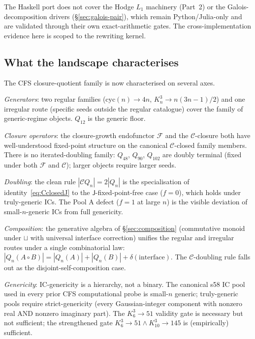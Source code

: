 \documentclass[12pt,a4paper]{article}
\theoremstyle{definition}
\theoremstyle{remark}
\newcommand{\Kn}{K_n^3}
\newcommand{\Qn}{Q_n}
\newcommand{\Ccls}{\mathcal{C}}             %
\newcommand{\Fcls}{\mathcal{F}}             %
\newcommand{\Jconj}{\mathsf{J}}             %
\newcommand{\cyc}{\mathrm{cyc}}
\begin{document}
The Haskell port does not cover the Hodge $L_1$ machinery (Part~2) or
the Galois-decomposition drivers (\S\ref{sec:galois-pair}), which
remain Python/Julia-only and are validated through their own
exact-arithmetic gates. The cross-implementation evidence here is
scoped to the rewriting kernel.

\subsection{What the landscape characterises}\label{sec:disc-characterises}

The CFS closure-quotient family is now characterised on several axes.

\emph{Generators}: two regular families ($\cyc(n) \to 4n$, $\Kn \to
n(3n{-}1)/2$) and one irregular route (specific seeds outside the
regular catalogue) cover the family of generic-regime objects.
$Q_{12}$ is the generic floor.

\emph{Closure operators}: the closure-growth endofunctor $\Fcls$ and
the $\Ccls$-closure both have well-understood fixed-point structure
on the canonical $\Ccls$-closed family members. There is no
iterated-doubling family: $Q_{48}$, $Q_{90}$, $Q_{102}$ are doubly
terminal (fixed under both $\Fcls$ and $\Ccls$); larger objects
require larger seeds.

\emph{Doubling}: the clean rule $|\Ccls\Qn| = 2|\Qn|$ is the
specialisation of identity~\eqref{eq:CclosedJ} to the
$\Jconj$-fixed-point-free case ($f = 0$), which holds under
truly-generic ICs. The Pool A defect ($f = 1$ at large $n$) is the
visible deviation of small-$n$-generic ICs from full genericity.

\emph{Composition}: the generative algebra of \S\ref{sec:composition}
(commutative monoid under $\sqcup$ with universal interface
correction) unifies the regular and irregular routes under a single
combinatorial law: $|\Qn(A \circ B)| = |\Qn(A)| + |\Qn(B)| +
\delta(\text{interface})$. The $\Ccls$-doubling rule falls out as the
disjoint-self-composition case.

\emph{Genericity}: IC-genericity is a hierarchy, not a binary. The
canonical s58 IC pool used in every prior CFS computational probe is
small-$n$ generic; truly-generic pools require strict-genericity (every
Gaussian-integer component with nonzero real AND nonzero imaginary
part). The $K_6^3 \to 51$ validity gate is necessary but not
sufficient; the strengthened gate $K_6^3 \to 51 \wedge K_{10}^3 \to
145$ is (empirically) sufficient.
\end{document}
